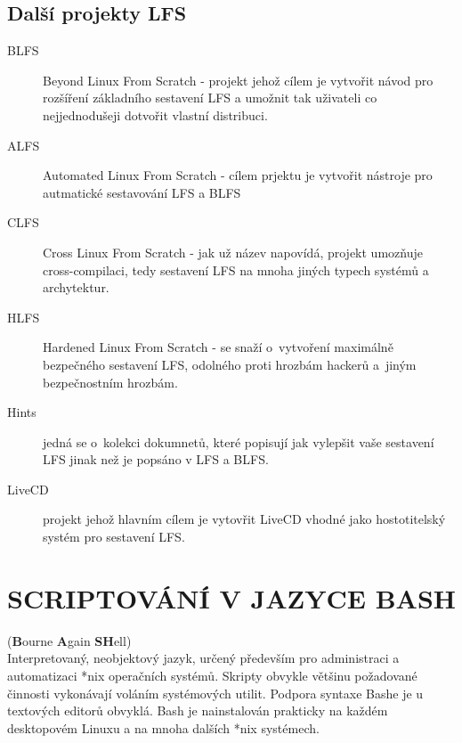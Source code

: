 \documentclass[a4paper,12pt]{article}
\newcommand{\upc}[1]{\uppercase{#1}} %
\renewcommand{\b}[1]{\textbf{#1}} %
\begin{document}
\subsection{Další projekty LFS}
\begin{description}
 \item[BLFS] Beyond Linux From Scratch - projekt jehož cílem je vytvořit návod pro rozšíření základního sestavení LFS a umožnit tak uživateli co nejjednodušeji dotvořit vlastní distribuci.
 \item[ALFS] Automated Linux From Scratch - cílem prjektu je vytvořit nástroje pro autmatické sestavování LFS a BLFS
 \item[CLFS] Cross Linux From Scratch - jak už název napovídá, projekt umozňuje cross-compilaci, tedy sestavení LFS na mnoha jiných typech systémů a archytektur.
 \item[HLFS] Hardened Linux From Scratch - se snaží o~vytvoření maximálně bezpečného sestavení LFS, odolného proti hrozbám hackerů a~jiným bezpečnostním hrozbám.
 \item[Hints] jedná se o~kolekci dokumnetů, které popisují jak vylepšit vaše sestavení LFS jinak než je popsáno v LFS a BLFS.
 \item[LiveCD] projekt jehož hlavním cílem je vytovřit LiveCD vhodné jako hostotitelský systém pro sestavení LFS.
 \end{description}

\section{\upc{Scriptování v jazyce BASH}}\label{sec:BASH-MAIN}
(\b{B}ourne \b{A}gain \b{SH}ell)\\
Interpretovaný, neobjektový jazyk, určený především pro administraci a automatizaci *nix operačních systémů. Skripty obvykle většinu požadované činnosti vykonávají voláním systémových utilit. Podpora syntaxe Bashe je u textových editorů obvyklá. Bash je nainstalován prakticky na každém desktopovém Linuxu a na mnoha dalších *nix systémech.\cite{ABCBASH}
\end{document}
